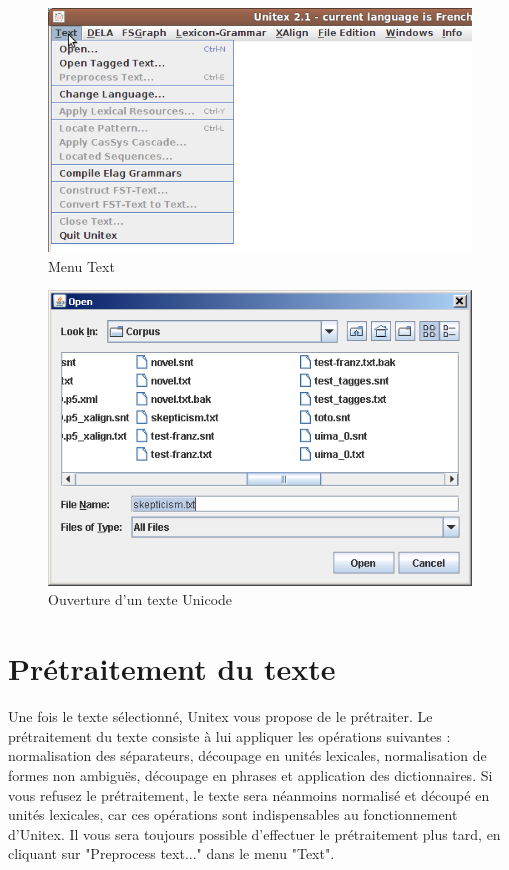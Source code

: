 \begin{figure}[!ht]
\begin{center}
\includegraphics[width=14cm]{resources/img/fig2-7.png}
\caption{Menu Text}
\end{center}
\end{figure}

\begin{figure}[!ht]
\begin{center}
\includegraphics[width=13cm]{resources/img/fig2-8.png}
\caption{Ouverture d’un texte Unicode}
\end{center}
\end{figure}



\section{Prétraitement du texte}
\noindent Une fois le texte sélectionné, Unitex vous propose de le prétraiter. Le prétraitement du
texte consiste à lui appliquer les opérations suivantes : normalisation des séparateurs, 
découpage en unités lexicales, normalisation de formes non ambiguës, découpage en phrases
et application des dictionnaires. Si vous refusez le prétraitement, le texte sera néanmoins
normalisé et découpé en unités lexicales, car ces opérations sont indispensables au
fonctionnement d’Unitex. Il vous sera toujours possible d’effectuer le prétraitement plus tard,
en cliquant sur "Preprocess text..." dans le menu "Text".


